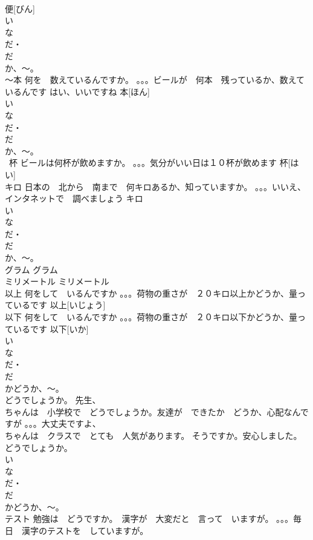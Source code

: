 \documentclass[8pt]{extreport}
\begin{document}
\begin{CJK}{UTF8}{min}
\\	便[びん]			
\\	い　
\\	な
\\	だ・
\\	だ 
\\	か、～。
\\	～本	何を　数えているんですか。 。。。ビールが　何本　残っているか、数えているんです はい、いいですね	本[ほん]			
\\	い　
\\	な
\\	だ・
\\	だ 
\\	か、～。
\\	~杯	ビールは何杯が飲めますか。 。。。気分がいい日は１０杯が飲めます	杯[はい]			
\\	キロ	日本の　北から　南まで　何キロあるか、知っていますか。 。。。いいえ、インタネットで　調べましょう	キロ			
\\	い　
\\	な
\\	だ・
\\	だ 
\\	か、～。
\\	グラム		グラム						
\\	ミリメートル		ミリメートル						
\\	以上	何をして　いるんですか 。。。荷物の重さが　２０キロ以上かどうか、量っているです	以上[いじょう]					
\\	以下	何をして　いるんですか 。。。荷物の重さが　２０キロ以下かどうか、量っているです	以下[いか]			
\\	い　
\\	な
\\	だ・
\\	だ 
\\	かどうか、～。
\\	どうでしょうか。	先生、
\\	ちゃんは　小学校で　どうでしょうか。友達が　できたか　どうか、心配なんですが 。。。大丈夫ですよ、
\\	ちゃんは　クラスで　とても　人気があります。 そうですか。安心しました。	どうでしょうか。			
\\	い　
\\	な
\\	だ・
\\	だ 
\\	かどうか、～。
\\	テスト	勉強は　どうですか。　漢字が　大変だと　言って　いますが。 。。。毎日　漢字のテストを　していますが。

\end{CJK}
\end{document}
